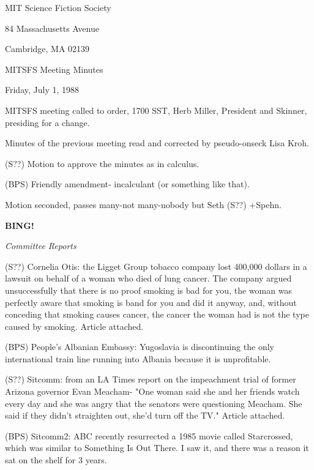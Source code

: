 \documentclass[12pt]{article}
\newcommand{\bing}{{\bf BING!} }
\newcommand{\goto}[1]{\bing \vskip 12pt \centerline{{\em{#1}}}}
\begin{document}
\begin{center}

MIT Science Fiction Society 

84 Massachusetts Avenue

Cambridge, MA 02139

\vspace{12pt}

MITSFS Meeting Minutes 

Friday, July 1, 1988

\end{center}
 
\vspace{18pt}

\setlength{\parskip}{6pt}

\noindent
MITSFS meeting called to order, 1700 SST,
Herb Miller, President and Skinner, presiding for a change.

Minutes of the previous meeting read and corrected by pseudo-onseck Lisa Kroh.

(S??) Motion to approve the minutes as in calculus.

(BPS) Friendly amendment- incalculant (or something like that).

Motion seconded, passes many-not many-nobody but Seth (S??) +Spehn.

\goto{Committee Reports}

(S??) Cornelia Otis: the Ligget Group tobacco company lost 400,000 dollars in a lawsuit on behalf of a woman who died of lung cancer. The company argued unsuccessfully that there is no proof smoking is bad for you, the woman was perfectly aware that smoking is band for you and did it anyway, and, without conceding that smoking causes cancer, the cancer the woman had is not the type caused by smoking. Article attached.

(BPS) People's Albanian Embassy: Yugoslavia is discontinuing the only international train line running into Albania because it is unprofitable.

(S??) Sitcomm: from an LA Times report on the impeachment trial of former Arizona governor Evan Meacham- "One woman said she and her friends watch every day and she was angry that the senators were questioning Meacham. She said if they didn't straighten out, she'd turn off the TV." Article attached.

(BPS) Sitcomm2: ABC recently resurrected a 1985 movie called Starcrossed, which was similar to Something Is Out There. I saw it, and there was a reason it sat on the shelf for 3 years.
\end{document}

